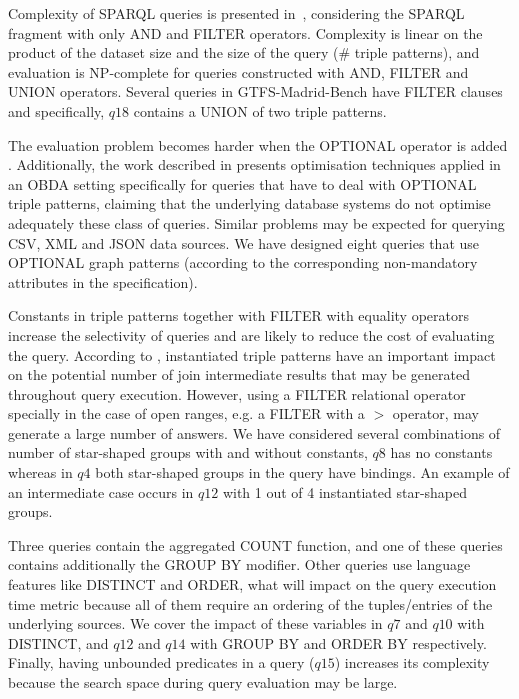 Complexity of SPARQL queries is presented in~\citep{perez2009semantics}, considering the SPARQL fragment with only AND and FILTER operators. Complexity is linear on the product of the dataset size and the size of the query (\# triple patterns), and evaluation is NP-complete for queries constructed with AND, FILTER and UNION operators. Several queries in GTFS-Madrid-Bench have FILTER clauses and specifically, $q18$ contains a UNION of two triple patterns.

The evaluation problem becomes harder when the OPTIONAL operator is added \citep{perez2009semantics}. Additionally, the work described in \citep{xiao2018efficient} presents optimisation techniques applied in an OBDA setting specifically for queries that have to deal with OPTIONAL triple patterns, claiming that the underlying database systems do not optimise adequately these class of queries. Similar problems may be expected for querying CSV, XML and JSON data sources. We have designed eight queries that use OPTIONAL graph patterns (according to the corresponding non-mandatory attributes in the specification). 

Constants in triple patterns together with FILTER with equality operators increase the selectivity of queries and are likely to reduce the cost of evaluating the query. According to \citep{montoya2012benchmarking}, instantiated triple patterns have an important impact on the potential number of join intermediate results that may be generated throughout query execution. However, using a FILTER relational operator specially in the case of open ranges, e.g. a FILTER with a $>$ operator, may generate a large number of answers. We have considered several combinations of number of star-shaped groups with and without constants, $q8$ has no constants whereas in $q4$ both star-shaped groups in the query have bindings. An example of an intermediate case occurs in $q12$ with 1 out of 4 instantiated star-shaped groups. 

Three queries contain the aggregated COUNT function, and one of these queries contains additionally the GROUP BY modifier. Other queries use language features like DISTINCT and ORDER, what will impact on the query execution time metric because all of them require an ordering of the tuples/entries of the underlying sources. We cover the impact of these variables in $q7$ and $q10$ with DISTINCT, and $q12$ and $q14$ with GROUP BY and ORDER BY respectively. Finally, having unbounded predicates in a query ($q15$) increases its complexity because the search space during query evaluation may be large. 

